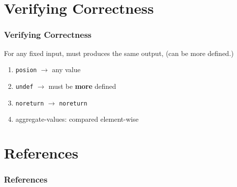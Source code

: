 \documentclass[aspectratio=169]{ctexbeamer}
\begin{document}
\section{Verifying Correctness}

\begin{frame}
    \frametitle{Verifying Correctness}

    For any fixed input, must produces the same output, (can be more defined.)

    \begin{enumerate}
        \item \texttt{posion} $\rightarrow$ any value
        \item \texttt{undef} $\rightarrow$ must be \textbf{more} defined
        \item \texttt{noreturn} $\rightarrow$ \texttt{noreturn}
        \item aggregate-values: compared element-wise
    \end{enumerate}


\end{frame}

\section{References}


\begin{frame}[allowframebreaks]
    \frametitle{References}
    
    
\end{frame}
\end{document}
